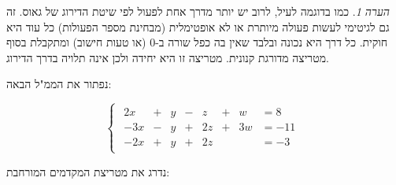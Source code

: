 \documentclass[
  hebrew,
  12pt,
  a4paper,
  oneside]{book}
\theoremstyle{definition}
\theoremstyle{remark}
\theoremstyle{plain}
\theoremstyle{remark}
\newtheorem*{remark}{הערה}
\begin{document}
\begin{remark}
כמו בדוגמה לעיל, לרוב יש יותר מדרך אחת לפעול לפי שיטת הדירוג של גאוס. זה
גם לגיטימי לעשות פעולה מיותרת או לא אופטימלית (מבחינת מספר הפעולות) כל
עוד היא חוקית. כל דרך היא נכונה ובלבד שאין בה כפל שורה ב-\(0\) (או טעות
חישוב) ומתקבלת בסוף מטריצה מדורגת קנונית. מטריצה זו היא יחידה ולכן אינה
תלויה בדרך הדירוג.
\end{remark}

\begin{example}

נפתור את הממ"ל הבאה:

\[\begin{cases}
\begin{alignedat}{8}
 2x &{}+{}&  y &{}-{}&  z &{}+{}&  w &=  8 \\[4pt]
-3x &{}-{}&  y &{}+{}& 2z &{}+{}& 3w &= -11 \\[4pt]
-2x &{}+{}&  y &{}+{}& 2z &     &    &= -3
\end{alignedat}
\end{cases}\]

נדרג את מטריצת המקדמים המורחבת:


\end{example}
\end{document}
